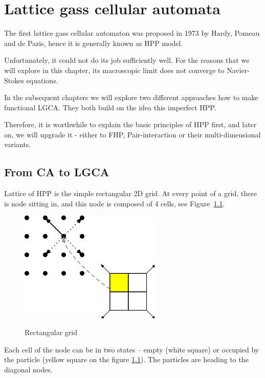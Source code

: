 \chapter{Lattice gass cellular automata}
The first lattice gass cellular automaton was proposed in 1973 by Hardy, Pomeau and de Pazis, hence it is generally known as HPP model.

Unfortunately, it could not do its job sufficiently well. For the reasons that we will explore in this chapter, its macroscopic limit does not converge to Navier-Stokes equations.

\bigskip

In the subsequent chapters we will explore two different approaches how to make functional LGCA. They both build on the idea this imperfect HPP.

Therefore, it is worthwhile to explain the basic principles of HPP first, and later on, we will upgrade it - either to FHP, Pair-interaction or their multi-dimensional variants.

\section{From CA to LGCA}

Lattice of HPP is the simple rectangular 2D grid. At every point of a grid, there is node sitting in, and this node is composed of 4 cells, see Figure~\ref{rectangular}.

\begin{figure}[htbp]
 \centering
 \includegraphics[width=0.6\textwidth]{./img/hpp}
 \label{rectangular}
 \caption{Rectangular grid}
\end{figure}

Each cell of the node can be in two states -- empty (white square) or occupied by the particle (yellow square on the figure \ref{rectangular}).
The particles are heading to the diagonal nodes.

